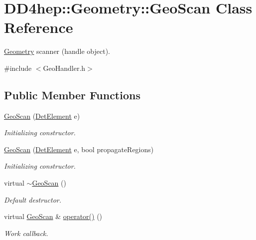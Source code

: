\hypertarget{class_d_d4hep_1_1_geometry_1_1_geo_scan}{
\section{DD4hep::Geometry::GeoScan Class Reference}
\label{class_d_d4hep_1_1_geometry_1_1_geo_scan}
}


\hyperlink{namespace_d_d4hep_1_1_geometry}{Geometry} scanner (handle object).  


{\ttfamily \#include $<$GeoHandler.h$>$}\subsection*{Public Member Functions}
\begin{DoxyCompactItemize}
\item 
\hyperlink{class_d_d4hep_1_1_geometry_1_1_geo_scan_a71d89e508d1251d7a2488ef3da92cf55}{GeoScan} (\hyperlink{class_d_d4hep_1_1_geometry_1_1_det_element}{DetElement} e)
\begin{DoxyCompactList}\small\item\em Initializing constructor. \item\end{DoxyCompactList}\item 
\hyperlink{class_d_d4hep_1_1_geometry_1_1_geo_scan_a0bc62c86bafdf3a832f6f81a8fb68bd7}{GeoScan} (\hyperlink{class_d_d4hep_1_1_geometry_1_1_det_element}{DetElement} e, bool propagateRegions)
\begin{DoxyCompactList}\small\item\em Initializing constructor. \item\end{DoxyCompactList}\item 
virtual \hyperlink{class_d_d4hep_1_1_geometry_1_1_geo_scan_afc8fa45ac2fd4eee7b0a3a8d355ec218}{$\sim$GeoScan} ()
\begin{DoxyCompactList}\small\item\em Default destructor. \item\end{DoxyCompactList}\item 
virtual \hyperlink{class_d_d4hep_1_1_geometry_1_1_geo_scan}{GeoScan} \& \hyperlink{class_d_d4hep_1_1_geometry_1_1_geo_scan_aa6914b5e822dcf712d110644b4c202f1}{operator()} ()
\begin{DoxyCompactList}\small\item\em Work callback. \item\end{DoxyCompactList}\end{DoxyCompactItemize}
